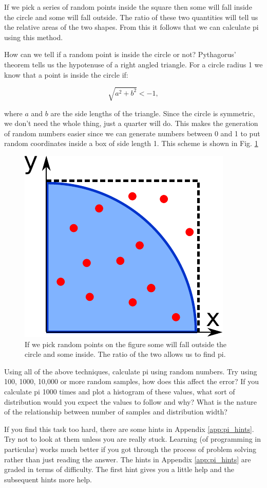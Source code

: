 	If we pick a series of random points inside the square then some will fall inside the circle and some will fall outside. The ratio of these two quantities will tell us the relative areas of the two shapes. From this it follows that we can calculate pi using this method.

	How can we tell if a random point is inside the circle or not? Pythagorus' theorem tells us the hypotenuse of a right angled triangle. For a circle radius 1 we know that a point is inside the circle if:

	\begin{equation}
	\sqrt{a^2+b^2} <- 1,
	\end{equation}

	where $a$ and $b$ are the side lengths of the triangle. Since the circle is symmetric, we don't need the whole thing, just a quarter will do. This makes the generation of random numbers easier since we can generate numbers between 0 and 1 to put random coordinates inside a box of side length 1. This scheme is shown in Fig. \ref{fig:piarc}

	\begin{figure}[h]
		\centering
		\includegraphics[scale=0.6]{images/piarc}
		\caption{If we pick random points on the figure some will fall outside the circle and some inside. The ratio of the two allows us to find pi.}
		\label{fig:piarc}
	\end{figure}

	\begin{task}Using all of the above techniques, calculate pi using random numbers. Try using 100, 1000, 10,000 or more random samples, how does this affect the error? If you calculate pi 1000 times and plot a histogram of these values, what sort of distribution would you expect the values to follow and why? What is the nature of the relationship between number of samples and distribution width?\end{task}
	If you find this task too hard, there are some hints in Appendix \ref{app:pi_hints}. Try not to look at them unless you are really stuck. Learning (of programming in particular) works much better if you got through the process of problem solving rather than just reading the answer. The hints in Appendix \ref{app:pi_hints} are graded in terms of difficulty. The first hint gives you a little help and the subsequent hints more help.

